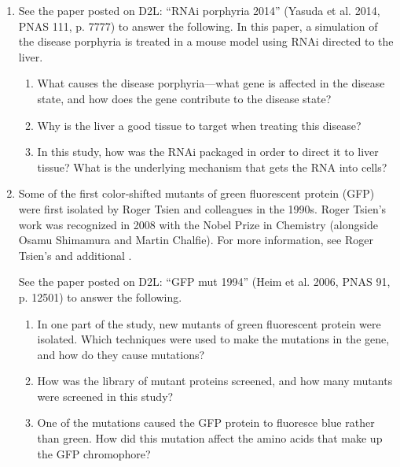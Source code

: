\documentclass[basic]{inVerba-notes}
\begin{document}
\begin{enumerate}[align=left, leftmargin=0pt, labelindent=\parindent, listparindent=\parindent, labelwidth=0pt, itemindent=!]\color{minor}
  \item {} See the paper posted on D2L\@: “RNAi porphyria 2014” (Yasuda et al. 2014, PNAS 111, p. 7777) to answer the following. In this paper, a simulation of the disease porphyria is treated in a mouse model using RNAi directed to the liver.
  \begin{enumerate}
    \item {} What causes the disease porphyria---what gene is affected in the disease state, and how does the gene contribute to the disease state?
    \item {} Why is the liver a good tissue to target when treating this disease?
    \item {} In this study, how was the RNAi packaged in order to direct it to liver tissue? What is the underlying mechanism that gets the RNA into cells?
  \end{enumerate}

  \item {} Some of the first color-shifted mutants of green fluorescent protein (GFP) were first isolated by Roger Tsien and colleagues in the 1990s. Roger Tsien’s work was recognized in 2008 with the Nobel Prize in Chemistry (alongside Osamu Shimamura and Martin Chalfie). For more information, see Roger Tsien’s  and additional . 
  
  
  See the paper posted on D2L\@: “GFP mut 1994” (Heim et al. 2006, PNAS 91, p. 12501) to answer the following.

  \begin{enumerate}
    \item {} In one part of the study, new mutants of green fluorescent protein were isolated. Which techniques were used to make the mutations in the gene, and how do they cause mutations?
    \item {} How was the library of mutant proteins screened, and how many mutants were screened in this study?
    \item {} One of the mutations caused the GFP protein to fluoresce blue rather than green. How did this mutation affect the amino acids that make up the GFP chromophore?
  \end{enumerate}


\end{enumerate}
\end{document}
